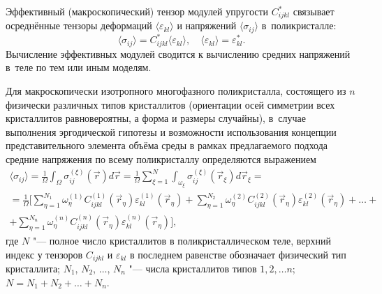 \smallskip

Эффективный (макроскопический) тензор модулей упругости $C_{ijkl}^\ast$ связывает осреднённые тензоры деформаций $\langle \varepsilon _{kl}\rangle $ и напряжений $\langle \sigma _{ij} \rangle $ в~поликристалле:
\begin{equation}
\label{tashk:eq20}
\langle \sigma _{ij} \rangle =C_{ijkl}^\ast \langle \varepsilon _{kl} 
\rangle,
\quad
\langle \varepsilon _{kl} \rangle =\varepsilon _{kl}^\ast.
\end{equation}
Вычисление эффективных модулей сводится к вычислению средних напряжений в~теле по тем или иным моделям.

Для макроскопически изотропного многофазного поликристалла, состоящего из $n$ физически различных типов кристаллитов (ориентации осей симметрии всех кристаллитов равновероятны, а форма и размеры случайны), в~случае выполнения эргодической гипотезы и возможности использования концепции представительного элемента объёма среды в рамках предлагаемого подхода средние напряжения по всему поликристаллу определяются выражением
\begin{multline}
\label{tashk:eq21}
\langle \sigma _{ij} \rangle =\frac{1}{\Omega } \int _\Omega 
\sigma_{ij}^{(\xi)} (\vec {r})d\vec {r} =\frac{1}{\Omega }\sum\limits_{\xi =1}^N
 \int _{\omega _\xi} \sigma _{ij}^{(\xi )} (\vec {r}_\xi )d\vec
{r}_\xi  = \\
 =\frac{1}{\Omega }\biggl[ \sum\limits_{\eta =1}^{N_1} \omega_\eta^{(1)}
C_{ijkl}^{(1)} (\vec {r}_\eta )\varepsilon_{kl}^{(1)} (\vec {r}_\eta
)+\sum\limits_{\eta =1}^{N_2} \omega _\eta ^{(2)} C_{ijkl}^{(2)} (\vec
{r}_\eta)\varepsilon_{kl}^{(2)} (\vec {r}_\eta )+\dots+\\
+\sum\limits_{\eta
=1}^{N_n } \omega_\eta^{(n)} C_{ijkl}^{(n)} (\vec {r}_\eta )\varepsilon
_{kl}^{(n)} (\vec {r}_\eta )\biggr],
 \end{multline}
где $N$ "--- полное число кристаллитов в поликристаллическом теле, верхний индекс у тензоров $C_{ijkl}$ и $\varepsilon _{kl}$ в последнем равенстве обозначает физический тип кристаллита; 
$ N_{1}$, $ N_{2}$, $\ldots$,  $N_{n}$ "--- числа кристаллитов
типов $1, 2, \ldots n$; $N= N_{1}+ N_{2}+ \ldots + N_{n}$.

